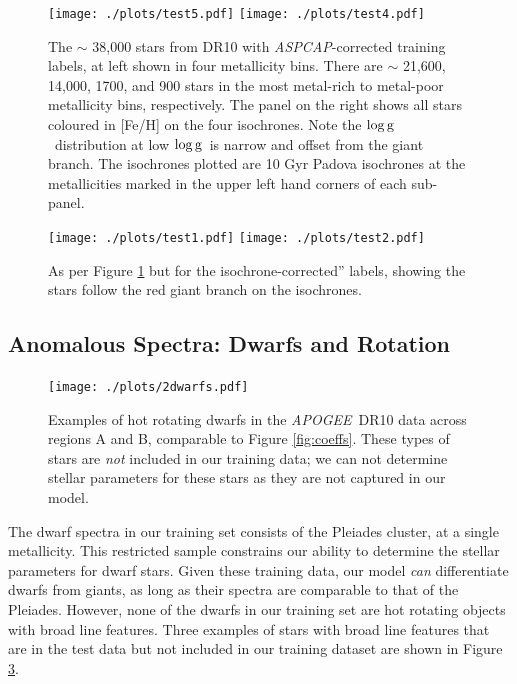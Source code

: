 \documentclass[12pt, preprint]{aastex}
\newcommand{\logg}{\mbox{$\rm \log g$}}
\newcommand{\apogee}{\textsl{APOGEE}}
\newcommand{\aspcap}{\textsl{ASPCAP}}
\begin{document}
\begin{figure}[!h]
\centering
  \texttt{[image: ./plots/test5.pdf]}
  \hspace{-20pt}
    \texttt{[image: ./plots/test4.pdf]}
\caption{The $\sim$ 38,000 stars from DR10 with \aspcap-corrected training labels, at left shown in four metallicity bins. There are $\sim$ 21,600, 14,000, 1700, and 900 stars in the most metal-rich to metal-poor metallicity bins, respectively. The panel on the right shows all stars coloured in [Fe/H] on the four isochrones. Note the \logg\ distribution at low \logg\ is narrow and offset from the giant branch. The isochrones plotted are 10 Gyr Padova isochrones at the metallicities marked in the upper left hand corners of each sub-panel.}
\label{fig:iso}
\end{figure}


\begin{figure}[!h]
\centering

      \texttt{[image: ./plots/test1.pdf]}
  \hspace{-20pt}
    \texttt{[image: ./plots/test2.pdf]}
\caption{As per Figure \ref{fig:iso} but for the isochrone-corrected'' labels, showing the stars follow the red giant branch on the isochrones.}
\label{fig:iso2}
\end{figure}



\subsection{Anomalous Spectra: Dwarfs and Rotation}

  \begin{figure}[!h]
   \centering
 \texttt{[image: ./plots/2dwarfs.pdf]}
  \caption{Examples of hot rotating dwarfs in the \apogee\ DR10 data across regions A and B, comparable to Figure \ref{fig:coeffs}. These types of stars are \textit{not} included in our training data; we can not determine stellar parameters for these stars as they are not captured in our model.}
\label{fig:dwarfs}
\end{figure}


The dwarf spectra in our training set consists of the Pleiades cluster, at a single metallicity. This restricted sample constrains our ability to determine the stellar parameters for dwarf stars. Given these training data, our model \textit{can} differentiate dwarfs from giants, as long as their spectra are comparable to that of the Pleiades. However, none of the dwarfs in our training set are hot rotating objects with broad line features. Three examples of stars with broad line features that are in the test data but not included in our training dataset are shown in Figure \ref{fig:dwarfs}.
\end{document}
